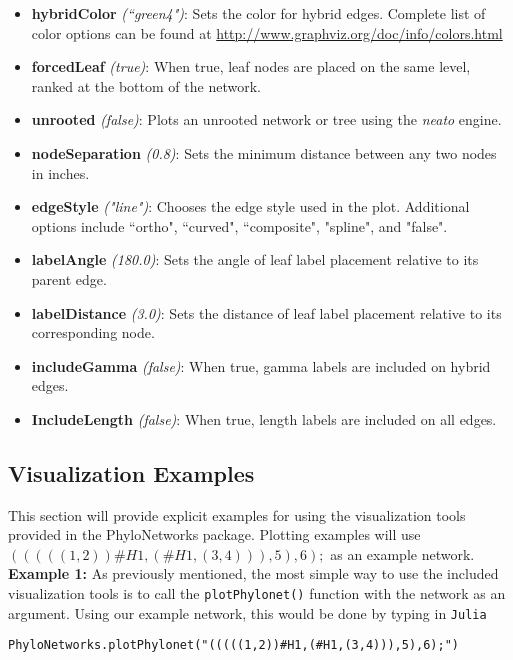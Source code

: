 \documentclass[12pt]{article}
\begin{document}
\begin{itemize}
\item \textbf{hybridColor} \textit{(``green4")}: Sets the color for hybrid edges. Complete list of color options can be found at \url{http://www.graphviz.org/doc/info/colors.html}

\item \textbf{forcedLeaf} \textit{(true)}: When true, leaf nodes are placed on the same level, ranked at the bottom of the network.

\item \textbf{unrooted} \textit{(false)}: Plots an unrooted network or tree using the \textit{neato} engine.

\item \textbf{nodeSeparation} \textit{(0.8)}: Sets the minimum distance between any two nodes in inches.

\item \textbf{edgeStyle} \textit{("line")}: Chooses the edge style used in the plot. Additional options include ``ortho", ``curved", ``composite", "spline", and "false".

\item \textbf{labelAngle} \textit{(180.0)}: Sets the angle of leaf label placement relative to its parent edge.

\item \textbf{labelDistance} \textit{(3.0)}: Sets the distance of leaf label placement relative to its corresponding node.

\item \textbf{includeGamma} \textit{(false)}: When true, gamma labels are included on hybrid edges.

\item \textbf{IncludeLength} \textit{(false)}: When true, length labels are included on all edges.

\end{itemize}


\subsection{Visualization Examples}

This section will provide explicit examples for using the visualization tools provided in the PhyloNetworks package.
Plotting examples will use $(((((1,2))\#H1,(\#H1,(3,4))),5),6);$ as an example network. \\

\noindent \textbf{Example 1:} As previously mentioned, the most simple way to use the included visualization tools is to call the \texttt{plotPhylonet()} function with the network as an argument.
Using our example network, this would be done by typing in
\texttt{Julia}
\begin{lstlisting}
PhyloNetworks.plotPhylonet("(((((1,2))#H1,(#H1,(3,4))),5),6);")
\end{lstlisting}
\end{document}
